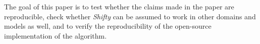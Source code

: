 The goal of this paper is to test whether the claims made in the paper are reproducible, check whether \textit{Shifty} can be assumed to work in other domains and models as well, and to verify the reproducibility of the open-source implementation of the algorithm.






